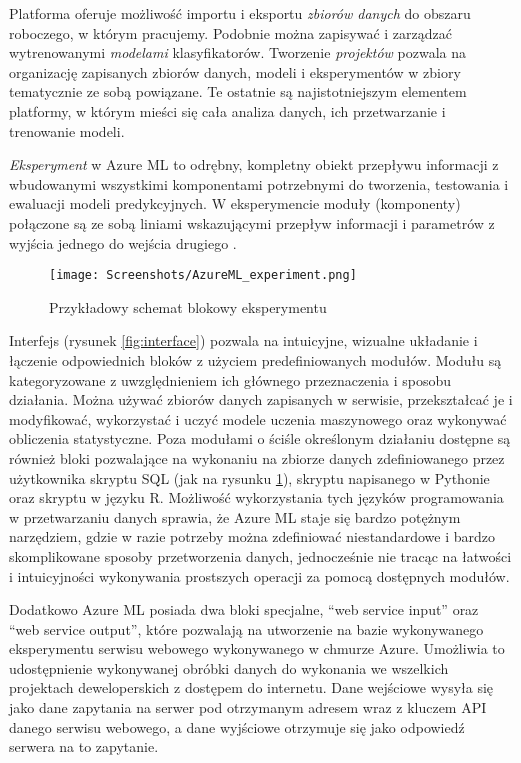 Platforma oferuje możliwość importu i eksportu \emph{zbiorów danych} do obszaru roboczego, w którym pracujemy.
Podobnie można zapisywać i zarządzać wytrenowanymi \emph{modelami} klasyfikatorów.
Tworzenie \emph{projektów} pozwala na organizację zapisanych zbiorów danych, modeli i eksperymentów w zbiory tematycznie ze sobą powiązane.
Te ostatnie są najistotniejszym elementem platformy, w którym mieści się cała analiza danych, ich przetwarzanie i trenowanie modeli.

\emph{Eksperyment} w Azure ML to odrębny, kompletny obiekt przepływu informacji z wbudowanymi wszystkimi komponentami potrzebnymi do tworzenia, testowania i ewaluacji modeli predykcyjnych.
W eksperymencie moduły (komponenty) połączone są ze sobą liniami wskazującymi przepływ informacji i parametrów z wyjścia jednego do wejścia drugiego \cite{barga2015introducing}.

\begin{figure}[ht]
	\texttt{[image: Screenshots/AzureML\_experiment.png]}
	\caption{Przykładowy schemat blokowy eksperymentu}
	\label{fig:experiment}
\end{figure}

Interfejs (rysunek \ref{fig:interface}) pozwala na intuicyjne, wizualne układanie i łączenie odpowiednich bloków z użyciem predefiniowanych modułów.
Modułu są kategoryzowane z uwzględnieniem ich głównego przeznaczenia i sposobu działania.
Można używać zbiorów danych zapisanych w serwisie, przekształcać je i modyfikować, wykorzystać i uczyć modele uczenia maszynowego oraz wykonywać obliczenia statystyczne.
Poza modułami o ściśle określonym działaniu dostępne są również bloki pozwalające na wykonaniu na zbiorze danych zdefiniowanego przez użytkownika skryptu SQL (jak na rysunku \ref{fig:experiment}), skryptu napisanego w Pythonie oraz skryptu w języku R.
Możliwość wykorzystania tych języków programowania w przetwarzaniu danych sprawia, że Azure ML staje się bardzo potężnym narzędziem, gdzie w razie potrzeby można zdefiniować niestandardowe i bardzo skomplikowane sposoby przetworzenia danych, jednocześnie nie tracąc na łatwości i intuicyjności wykonywania prostszych operacji za pomocą dostępnych modułów.

Dodatkowo Azure ML posiada dwa bloki specjalne, ``web service input'' oraz ``web service output'', które pozwalają na utworzenie na bazie wykonywanego eksperymentu serwisu webowego wykonywanego w chmurze Azure.
Umożliwia to udostępnienie wykonywanej obróbki danych do wykonania we wszelkich projektach deweloperskich z dostępem do internetu.
Dane wejściowe wysyła się jako dane zapytania na serwer pod otrzymanym adresem wraz z kluczem API danego serwisu webowego, a dane wyjściowe otrzymuje się jako odpowiedź serwera na to zapytanie.
